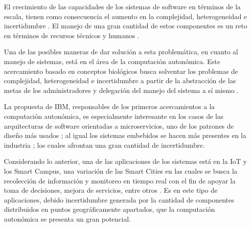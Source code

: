 \documentclass[12pt]{article}
\begin{document}
    

    El crecimiento de las capacidades de los sistemas de software en términos de la escala, tienen como consecuencia el aumento en la complejidad, heterogeneidad e incertidumbre \cite{emerging_2005}. El manejo de una gran cantidad de estos componentes es un reto en términos de recursos técnicos y humanos \cite[pp.~4-5]{horn_2001}. 
    
    Una de las posibles maneras de dar solución a esta problemática, en cuanto al manejo de sistemas, está en el área de la computación autonómica. Este acercamiento basado en conceptos biológicos busca solventar los problemas de complejidad, heterogeneidad e incertidumbre \cite{emerging_2005} a partir de la abstracción de las metas de los administradores y delegación del manejo del sistema a sí mismo \cite{lalanda_diaconescu_mccann_2014}.
    
    La propuesta de IBM, responsables de los primeros acercamientos a la computación autonómica, es especialmente interesante en los casos de las arquitecturas de software orientadas a microservicios, uno de los patrones de diseño más usados \cite{forrester_research_2019}; al igual los sistemas embebidos se hacen más presentes en la industria \cite{deichmann_2022}; los cuales afrontan una gran cantidad de incertidumbre. 
    
    Considerando lo anterior, una de las aplicaciones de los sistemas está en la IoT y los Smart Campus, una variación de las Smart Cities en las cuales se busca la recolección de información y monitoreo en tiempo real con el fin de apoyar la toma de decisiones, mejora de servicios, entre otros \cite{MinAllah2020}. Es en este tipo de aplicaciones, debido incertidumbre generada por la cantidad de componentes distribuidos en puntos geográficamente apartados, que la computación autonómica se presenta un gran potencial. 
\end{document}
